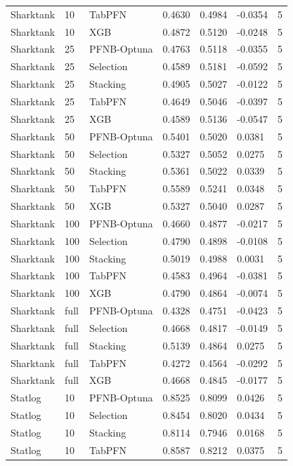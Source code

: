 \begin{tabular}{llllllr}
Sharktank & 10 & TabPFN & 0.4630 & 0.4984 & -0.0354 & 5 \\
Sharktank & 10 & XGB & 0.4872 & 0.5120 & -0.0248 & 5 \\
Sharktank & 25 & PFNB-Optuna & 0.4763 & 0.5118 & -0.0355 & 5 \\
Sharktank & 25 & Selection & 0.4589 & 0.5181 & -0.0592 & 5 \\
Sharktank & 25 & Stacking & 0.4905 & 0.5027 & -0.0122 & 5 \\
Sharktank & 25 & TabPFN & 0.4649 & 0.5046 & -0.0397 & 5 \\
Sharktank & 25 & XGB & 0.4589 & 0.5136 & -0.0547 & 5 \\
Sharktank & 50 & PFNB-Optuna & 0.5401 & 0.5020 & 0.0381 & 5 \\
Sharktank & 50 & Selection & 0.5327 & 0.5052 & 0.0275 & 5 \\
Sharktank & 50 & Stacking & 0.5361 & 0.5022 & 0.0339 & 5 \\
Sharktank & 50 & TabPFN & 0.5589 & 0.5241 & 0.0348 & 5 \\
Sharktank & 50 & XGB & 0.5327 & 0.5040 & 0.0287 & 5 \\
Sharktank & 100 & PFNB-Optuna & 0.4660 & 0.4877 & -0.0217 & 5 \\
Sharktank & 100 & Selection & 0.4790 & 0.4898 & -0.0108 & 5 \\
Sharktank & 100 & Stacking & 0.5019 & 0.4988 & 0.0031 & 5 \\
Sharktank & 100 & TabPFN & 0.4583 & 0.4964 & -0.0381 & 5 \\
Sharktank & 100 & XGB & 0.4790 & 0.4864 & -0.0074 & 5 \\
Sharktank & full & PFNB-Optuna & 0.4328 & 0.4751 & -0.0423 & 5 \\
Sharktank & full & Selection & 0.4668 & 0.4817 & -0.0149 & 5 \\
Sharktank & full & Stacking & 0.5139 & 0.4864 & 0.0275 & 5 \\
Sharktank & full & TabPFN & 0.4272 & 0.4564 & -0.0292 & 5 \\
Sharktank & full & XGB & 0.4668 & 0.4845 & -0.0177 & 5 \\
Statlog & 10 & PFNB-Optuna & 0.8525 & 0.8099 & 0.0426 & 5 \\
Statlog & 10 & Selection & 0.8454 & 0.8020 & 0.0434 & 5 \\
Statlog & 10 & Stacking & 0.8114 & 0.7946 & 0.0168 & 5 \\
Statlog & 10 & TabPFN & 0.8587 & 0.8212 & 0.0375 & 5 \\

\end{tabular}
